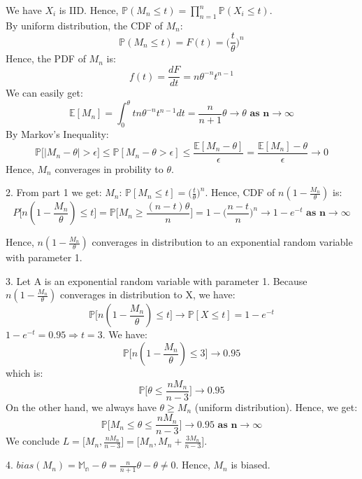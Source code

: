 \documentclass[10pt]{article}
\newenvironment{problem}[2][Problem]{\begin{trivlist}
\item[\hskip \labelsep {\bfseries #1}\hskip \labelsep {\bfseries #2.}]}{\end{trivlist}}
\begin{document}
\begin{problem}{4}
We have $X_i$ is IID. Hence, $\mathbb{P}(M_n \leqslant t)=\prod_{n=1}^{n}\mathbb{P}(X_i\leqslant t).$\\
By uniform distribution, the CDF of $M_n$:
\[ \mathbb{P}(M_n \leqslant t)=F(t)=\Big(\frac{t}{\theta}\Big)^n \]
Hence, the PDF of $M_n$ is:
\[f(t)=\frac{dF}{dt}=n\theta^{-n}t^{n-1} \]
We can easily get:
\[\mathbb{E}[M_n]= \int_{0}^{\theta} tn\theta^{-n}t^{n-1}dt=\frac{n}{n+1}\theta \rightarrow \theta \textbf{ as n}\rightarrow \infty \]
By Markov's Inequality:
\[ \mathbb{P}\Big[ | M_n -\theta|> \epsilon \Big]\leqslant \mathbb{P}[M_n-\theta>\epsilon] \leqslant \frac{\mathbb{E}[M_n-\theta]}{\epsilon}=\frac{\mathbb{E}[M_n]-\theta}{\epsilon} \rightarrow 0\]
Hence, $M_n$ converages in probility to $\theta$.

\item 2.
From part 1 we get: $M_n$: $\mathbb{P}[M_n \leqslant t]=\Big(\frac{t}{\theta}\Big)^n$. Hence, CDF of $n(1-\frac{M_n}{\theta})$ is:
\[ P\Big[n(1-\frac{M_n}{\theta})\leqslant t\Big]=\mathbb{P}\Big[M_n \geqslant \frac{(n-t)\theta}{n} \Big] =1-\Big(\frac{n-t}{n}\Big)^{n} \rightarrow 1- e^{-t} \textbf{ as n}  \rightarrow \infty\]

Hence, $n(1-\frac{M_n}{\theta})$ converages in distribution to an exponential random variable with parameter 1.
\item 3.
Let A is an exponential random variable with parameter 1. Because $n(1-\frac{M_n}{\theta})$ converages in distribution to X, we have:
\[\mathbb{P}\Big[ n(1-\frac{M_n}{\theta}) \leqslant t\Big] \rightarrow \mathbb{P}[X\leqslant t]= 1-e^{-t} \]
$1-e^{-t}=0.95 \Rightarrow t=3$. We have:
\[ \mathbb{P}\Big[ n(1-\frac{M_n}{\theta}) \leqslant 3\Big] \rightarrow 0.95\]
which is:
\[ \mathbb{P}\Big[ \theta \leqslant \frac{nM_n}{n-3}\Big] \rightarrow 0.95\]
On the other hand, we always have $\theta \geqslant M_n$ (uniform distribution). Hence, we get: 
\[ \mathbb{P}\Big[M_n \leqslant \theta \leqslant \frac{nM_n}{n-3}\Big] \rightarrow 0.95 \textbf{ as n} \rightarrow \infty\]
We conclude $L=\Big[M_n, \frac{nM_n}{n-3} \Big]=\Big[ M_n, M_n+ \frac{3M_n}{n-3} \Big]$.
\item 4.
$bias(M_n)=\mathbb{M_n}-\theta= \frac{n}{n+1}\theta -\theta \neq 0$. Hence, $M_n$ is biased.
\end{problem}
\end{document}
